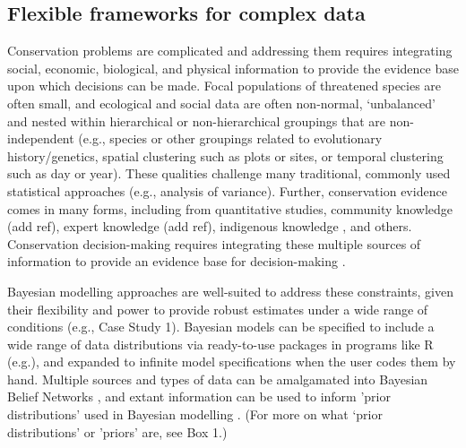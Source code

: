 \documentclass{article}
\begin{document}
\subsection*{Flexible frameworks for complex data}
\par Conservation problems are complicated and addressing them requires integrating social, economic, biological, and physical information to provide the evidence base upon which decisions can be made. Focal populations of threatened species are often small, and ecological and social data are often non-normal, `unbalanced' and nested within hierarchical or non-hierarchical groupings that are non-independent (e.g., species or other groupings related to evolutionary history/genetics, spatial clustering such as plots or sites, or temporal clustering such as day or year). These qualities challenge many traditional, commonly used statistical approaches (e.g., analysis of variance). Further, conservation evidence comes in many forms, including from quantitative studies, community knowledge (add ref), expert knowledge (add ref), indigenous knowledge \citep[e.g.,][]{gryba2023indigenous}, and others. Conservation decision-making requires integrating these multiple sources of information to provide an evidence base for decision-making \citep{stern2022interweaving}. 
\par Bayesian modelling approaches are well-suited to address these constraints, given their flexibility and power to provide robust estimates under a wide range of conditions (e.g., Case Study 1). Bayesian models can be specified to include a wide range of data distributions via ready-to-use packages in programs like R (e.g.), and expanded to infinite  model specifications when the user codes them by hand. Multiple sources and types of data can be amalgamated into Bayesian Belief Networks \citep{marcot2001using,newton2007bayesian}, and extant information can be used to inform 'prior distributions' used in Bayesian modelling \citep{o2008informed,mcneish2016using}. (For more on what `prior distributions' or 'priors' are, see Box 1.)
\end{document}
